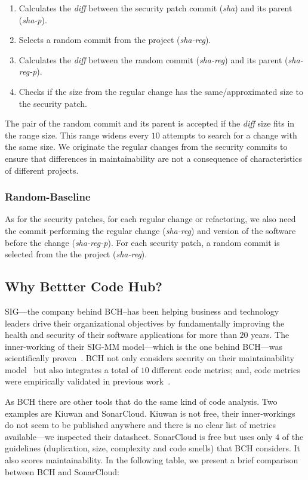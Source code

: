 \documentclass[smallextended]{svjour3}       %
\begin{document}
\begin{enumerate}
\item Calculates the \emph{diff} between the security patch commit 
(\emph{sha}) and its parent (\emph{sha-p}).
\item Selects a random commit from the project (\emph{sha-reg}).
\item Calculates the \emph{diff} between the random commit (\emph{sha-reg}) 
and its parent (\emph{sha-reg-p}).
\item Checks if the size from the regular change has the 
same/approximated size to the security patch.
\end{enumerate}

The pair of the random commit and its parent is accepted if the 
\emph{diff} size fits in the range size. This range widens every 
$10$ attempts to search for a change with the same size. We 
originate the regular changes from the security commits to ensure 
that differences in maintainability are not a consequence of 
characteristics of different projects.

\subsubsection{Random-Baseline} 

As for the security patches, for each regular change or refactoring, we also 
need the commit performing the regular change (\emph{sha-reg}) and version of 
the software before the change (\emph{sha-reg-p}). For each security patch, 
a random commit is selected from the the project (\emph{sha-reg}).

\subsection{Why Bettter Code Hub?}

SIG---the company behind BCH--has been helping business and technology 
leaders drive their organizational 
objectives by fundamentally improving the health and security of 
their software applications for more than $20$ years. The
inner-working of their SIG-MM model---which is the one behind BCH---was 
scientifically proven~\cite{4335232,5609747,6113040,baggen2012}.
BCH not only considers security on their maintainability model~\cite{6616351}
but also integrates a total of $10$ different code metrics; and, 
code metrics were empirically validated in previous 
work~\cite{Bijlsma:2012:FIR:2317098.2317124,8530041,8919169,8785997}.

As BCH there are other tools that do the same kind of code analysis.
Two examples are Kiuwan and SonarCloud. Kiuwan is not free, their 
inner-workings do not seem to be published anywhere and there is
no clear list of metrics available---we inspected their datasheet.
SonarCloud is free but uses only $4$ of the guidelines (duplication,
size, complexity and code smells) that BCH considers. It also scores 
maintainability. In the following table, we
present a brief comparison between BCH and SonarCloud:
\end{document}
